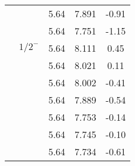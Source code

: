 \documentclass[prd,twocolumn,floatfix,nofootinbib]{revtex4}
\begin{document}
\begin{table*}[!htbp]
\begin{tabular}{ccccc}
            &               &5.64   &7.891 &-0.91  \\
            &               &5.64   &7.751 &-1.15  \\
            &${1/2}^{-}$    &5.64   &8.111 &0.45  \\
            &               &5.64   &8.021 &0.11  \\
            &               &5.64   &8.002 &-0.41  \\
            &               &5.64   &7.889 &-0.54  \\
            &               &5.64   &7.753 &-0.14  \\
            &               &5.64   &7.745 &-0.10  \\
            &               &5.64   &7.734 &-0.61  \\
        \hline\hline
    \end{tabular}
\end{table*}
\end{document}

